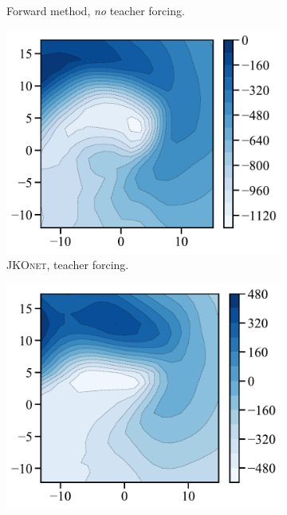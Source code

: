 \begin{figure}[t]
\begin{subfigure}[t]{0.24\textwidth}
         \caption{Forward method, \protect\newline \emph{no} teacher forcing.}
     \end{subfigure}
     \hfill
     \begin{subfigure}[t]{0.24\textwidth}
         \centering
         \includegraphics[width=\textwidth]{figures/fig_energy_implicit_spiral_tf.pdf}
         \caption{\textsc{JKOnet}, \protect\newline teacher forcing.}
     \end{subfigure}
     \hfill
     \begin{subfigure}[t]{0.24\textwidth}
         \centering
         \includegraphics[width=\textwidth]{figures/fig_energy_implicit_spiral.pdf}

\end{subfigure}
\end{figure}
